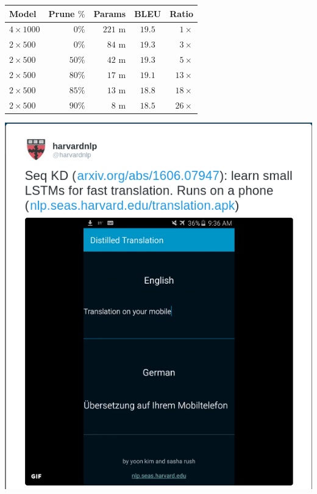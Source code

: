 \documentclass{beamer}
\newcommand{\air}{\vspace{0.25cm}}
\begin{document}
\begin{frame}
\centerline{}
\air
\air
\begin{table}[t] \label{prune}
\centering
\small
\begin{tabular}{l  r  r c  r }
\toprule
Model & Prune $\%$ & Params & BLEU & Ratio \\
\midrule 
$4 \times 1000$ & $0\%$ &$221$ m& $19.5$& $1 \times$   \\
$2 \times 500$ &  $0\%$& $84$ m& $19.3$& $3 \times$   \\
$2 \times 500$ & $50\%$& $42$ m&  $19.3$ & $5 \times$ \\
$2 \times 500$ &  $80\%$& $17$ m&  $19.1$ & $13 \times$ \\
$2 \times 500$ &  $85\%$& $13$ m&  $18.8$ & $18 \times$ \\
$2 \times 500$ &  $90\%$& $8$ m &  $18.5$  & $26 \times$ \\

\bottomrule
\end{tabular}
\end{table}
\end{frame}


\begin{frame}
  
  \begin{center}
    \includegraphics[height=0.9\textheight]{phonemt}
  \end{center}
\end{frame}
\end{document}

